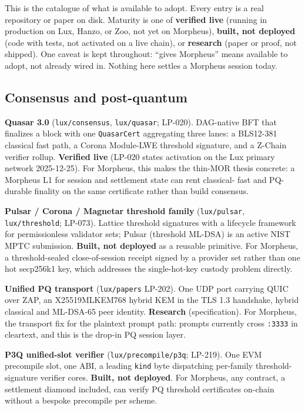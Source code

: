 \documentclass[11pt,a4paper]{article}
\newcommand{\code}[1]{\texttt{\small #1}}
\begin{document}
This is the catalogue of what is available to adopt. Every entry is a real repository or paper
on disk. Maturity is one of \textbf{verified live} (running in production on Lux, Hanzo, or Zoo,
not yet on Morpheus), \textbf{built, not deployed} (code with tests, not activated on a live
chain), or \textbf{research} (paper or proof, not shipped). One caveat is kept throughout:
``gives Morpheus'' means available to adopt, not already wired in. Nothing here settles a
Morpheus session today.

\subsection{Consensus and post-quantum}

\textbf{Quasar 3.0} (\code{lux/consensus}, \code{lux/quasar}; LP-020). DAG-native BFT that
finalizes a block with one \code{QuasarCert} aggregating three lanes: a BLS12-381 classical fast
path, a Corona Module-LWE threshold signature, and a Z-Chain verifier rollup. \textbf{Verified
live} (LP-020 states activation on the Lux primary network 2025-12-25). For Morpheus, this makes
the thin-MOR thesis concrete: a Morpheus L1 for session and settlement state can rent classical-
fast and PQ-durable finality on the same certificate rather than build consensus.

\textbf{Pulsar / Corona / Magnetar threshold family} (\code{lux/pulsar}, \code{lux/threshold};
LP-073). Lattice threshold signatures with a lifecycle framework for permissionless validator
sets; Pulsar (threshold ML-DSA) is an active NIST MPTC submission. \textbf{Built, not deployed}
as a reusable primitive. For Morpheus, a threshold-sealed close-of-session receipt signed by a
provider set rather than one hot secp256k1 key, which addresses the single-hot-key custody
problem directly.

\textbf{Unified PQ transport} (\code{lux/papers} LP-202). One UDP port carrying QUIC over ZAP,
an X25519MLKEM768 hybrid KEM in the TLS 1.3 handshake, hybrid classical and ML-DSA-65 peer
identity. \textbf{Research} (specification). For Morpheus, the transport fix for the plaintext
prompt path: prompts currently cross \code{:3333} in cleartext, and this is the drop-in PQ
session layer.

\textbf{P3Q unified-slot verifier} (\code{lux/precompile/p3q}; LP-219). One EVM precompile slot,
one ABI, a leading \code{kind} byte dispatching per-family threshold-signature verifier cores.
\textbf{Built, not deployed}. For Morpheus, any contract, a settlement diamond included, can
verify PQ threshold certificates on-chain without a bespoke precompile per scheme.
\end{document}
